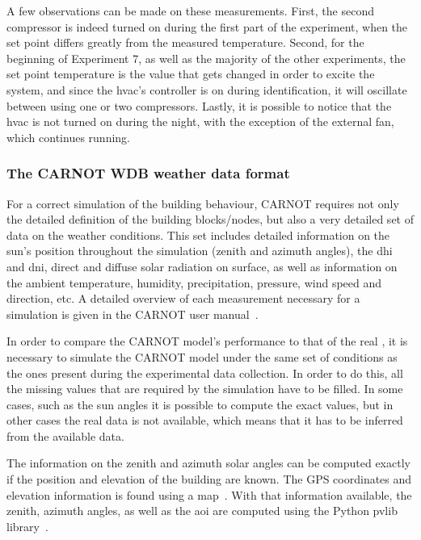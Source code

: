 A few observations can be made on these measurements. First, the second
compressor is indeed turned on during the first part of the experiment, when the
set point differs greatly from the measured temperature. Second, for the
beginning of Experiment 7, as well as the majority of the other experiments, the
set point temperature is the value that gets changed in order to excite the
system, and since the \acrshort{hvac}'s controller is on during identification,
it will oscillate between using one or two compressors. Lastly, it is possible
to notice that the \acrshort{hvac} is not turned on during the night, with the
exception of the external fan, which continues running.

\subsubsection{The CARNOT WDB weather data format}\label{sec:CARNOT_WDB}

For a correct simulation of the building behaviour, CARNOT requires not only the
detailed definition of the building blocks/nodes, but also a very detailed set
of data on the weather conditions. This set includes detailed information on the
sun's position throughout the simulation (zenith and azimuth angles), the
\acrfull{dhi} and \acrfull{dni}, direct and diffuse solar radiation on surface,
as well as information on the ambient temperature, humidity, precipitation,
pressure, wind speed and direction, etc.  A detailed overview of each
measurement necessary for a simulation is given in the CARNOT user
manual~\cite{CARNOTManual}.

In order to compare the CARNOT model's performance to that of the real \pdome,
it is necessary to simulate the CARNOT model under the same set of conditions as
the ones present during the experimental data collection. In order to do this,
all the missing values that are required by the simulation have to be filled. In
some cases, such as the sun angles it is possible to compute the exact values,
but in other cases the real data is not available, which means that it has to be
inferred from the available data.

The information on the zenith and azimuth solar angles can be computed exactly
if the position and elevation of the building are known. The GPS coordinates and
elevation information is found using a map~\cite{ElevationFinder}. With that
information available, the zenith, azimuth angles, as well as the \acrfull{aoi}
are computed using the Python pvlib
library~\cite{f.holmgrenPvlibPythonPython2018}.

